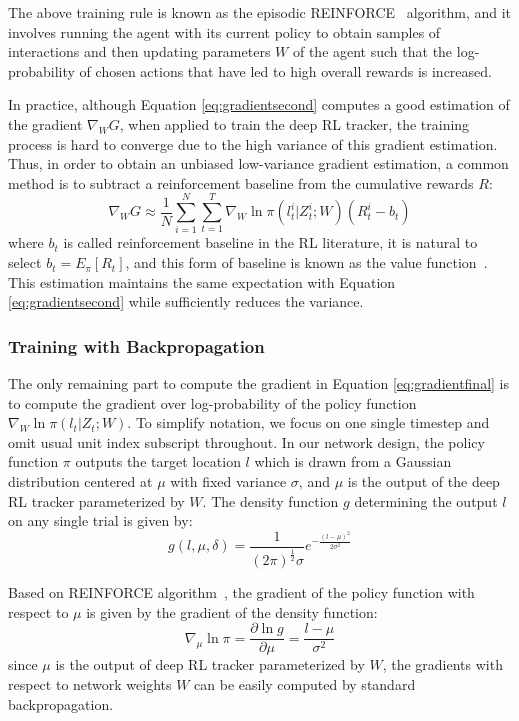 \documentclass[10pt,twocolumn,letterpaper]{article}
\begin{document}
    The above training rule is known as the episodic REINFORCE~\cite{williams1992simple} algorithm, and it involves running the agent with its current policy to obtain samples of interactions and then updating parameters $W$ of the agent such that the log-probability of  chosen actions that have led to high overall rewards is increased.
    
    In practice, although Equation \ref{eq:gradientsecond} computes a good estimation of the gradient $\nabla_{W}G$, when applied to train the deep RL tracker, the training process is hard to converge due to the high variance of this gradient estimation. Thus, in order to obtain an unbiased low-variance gradient estimation, a common method is to subtract a reinforcement baseline from the cumulative rewards $R$:
\begin{equation}
	\nabla_{W}G\approx\frac{1}{N}\sum_{i=1}^{N}\sum_{t=1}^{T}\nabla_{W}\ln\pi(l_t^i|Z_t^i;W)(R_t^i-b_t)
    \label{eq:gradientfinal}
\end{equation}
where $b_t$ is called reinforcement baseline in the RL literature, it is natural to select $b_t=E_{\pi}[R_t]$, and this form of baseline is known as the value function~\cite{sutton1999policy}. This estimation maintains the same expectation with Equation \ref{eq:gradientsecond} while sufficiently reduces the variance. 
    
    \subsubsection{Training with Backpropagation}
    
    The only remaining part to compute the gradient in Equation \ref{eq:gradientfinal} is to compute the gradient over log-probability of the policy function $\nabla_{W}\ln\pi(l_t|Z_t;W)$. To simplify notation, we focus on one single timestep and omit usual unit index subscript throughout. In our network design, the policy function $\pi$ outputs the target location $l$ which is drawn from a Gaussian distribution centered at $\mu$ with fixed variance $\sigma$, and $\mu$ is the output of the deep RL tracker parameterized by $W$. The density function $g$ determining the output $l$ on any single trial is given by:
\begin{equation}
	g(l,\mu,\delta)=\frac{1}{(2\pi)^{\frac{1}{2}}\sigma}e^{-\frac{(l-\mu)^2}{2\sigma^2}}
    \label{eq:densityfunction}
\end{equation}    
    
    Based on REINFORCE algorithm~\cite{williams1992simple}, the gradient of the policy function with respect to $\mu$ is given by the gradient of the density function:
\begin{equation}
	\nabla_{\mu}\ln\pi=\frac{\partial \ln g}{\partial \mu}=\frac{l-\mu}{\sigma^2}
    \label{eq:gradientgaussian}
\end{equation}
since $\mu$ is the output of deep RL tracker parameterized by $W$, the gradients with respect to network weights $W$ can be easily computed by standard backpropagation.
\end{document}
